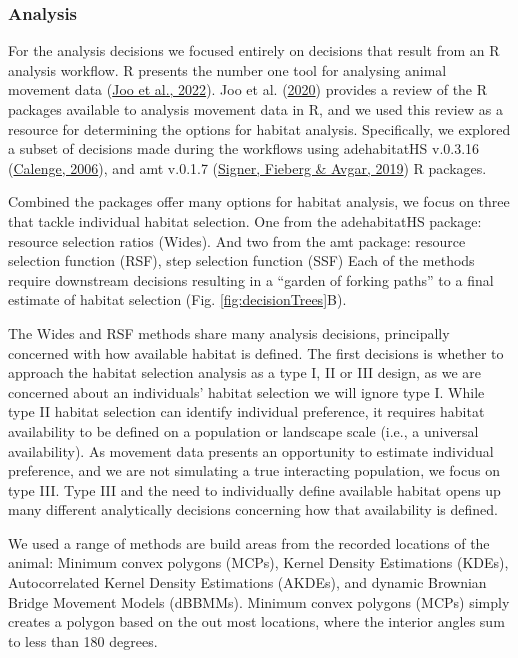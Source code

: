 \documentclass[10pt,a4paper]{article}
\begin{document}
\hypertarget{analysis}{%
\subsubsection{Analysis}\label{analysis}}

For the analysis decisions we focused entirely on decisions that result from an R analysis workflow.
R presents the number one tool for analysing animal movement data (\protect\hyperlink{ref-joo_recent_2022}{Joo et al., 2022}).
Joo et al. (\protect\hyperlink{ref-joo_navigating_2020}{2020}) provides a review of the R packages available to analysis movement data in R, and we used this review as a resource for determining the options for habitat analysis.
Specifically, we explored a subset of decisions made during the workflows using adehabitatHS v.0.3.16 (\protect\hyperlink{ref-adehabitatHS}{Calenge, 2006}), and amt v.0.1.7 (\protect\hyperlink{ref-amt}{Signer, Fieberg \& Avgar, 2019}) R packages.

Combined the packages offer many options for habitat analysis, we focus on three that tackle individual habitat selection.
One from the adehabitatHS package: resource selection ratios (Wides).
And two from the amt package: resource selection function (RSF), step selection function (SSF)
Each of the methods require downstream decisions resulting in a ``garden of forking paths'' to a final estimate of habitat selection (Fig. \ref{fig:decisionTrees}B).

The Wides and RSF methods share many analysis decisions, principally concerned with how available habitat is defined.
The first decisions is whether to approach the habitat selection analysis as a type I, II or III design, as we are concerned about an individuals' habitat selection we will ignore type I.
While type II habitat selection can identify individual preference, it requires habitat availability to be defined on a population or landscape scale (i.e., a universal availability).
As movement data presents an opportunity to estimate individual preference, and we are not simulating a true interacting population, we focus on type III.
Type III and the need to individually define available habitat opens up many different analytically decisions concerning how that availability is defined.

We used a range of methods are build areas from the recorded locations of the animal: Minimum convex polygons (MCPs), Kernel Density Estimations (KDEs), Autocorrelated Kernel Density Estimations (AKDEs), and dynamic Brownian Bridge Movement Models (dBBMMs).
Minimum convex polygons (MCPs) simply creates a polygon based on the out most locations, where the interior angles sum to less than 180 degrees.
\end{document}
